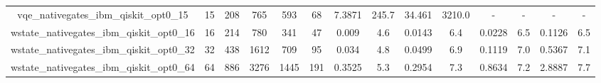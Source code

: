 \begin{table}[htb]
{\begin{tabular}{|c|c|c|c|c|c|c|c|c|c|c|c|c|c|}
vqe\_nativegates\_ibm\_qiskit\_opt0\_15 & 15 & 208 & 765 & 593 & 68 & 7.3871 & 245.7 & 34.461 & 3210.0 & - & - & - & - \\ 
wstate\_nativegates\_ibm\_qiskit\_opt0\_16 & 16 & 214 & 780 & 341 & 47 & 0.009 & 4.6 & 0.0143 & 6.4 & 0.0228 & 6.5 & 0.1126 & 6.5 \\ 
wstate\_nativegates\_ibm\_qiskit\_opt0\_32 & 32 & 438 & 1612 & 709 & 95 & 0.034 & 4.8 & 0.0499 & 6.9 & 0.1119 & 7.0 & 0.5367 & 7.1 \\ 
wstate\_nativegates\_ibm\_qiskit\_opt0\_64 & 64 & 886 & 3276 & 1445 & 191 & 0.3525 & 5.3 & 0.2954 & 7.3 & 0.8634 & 7.2 & 2.8887 & 7.7 \\ 
\hline 
\end{tabular}} 
\end{table} 
